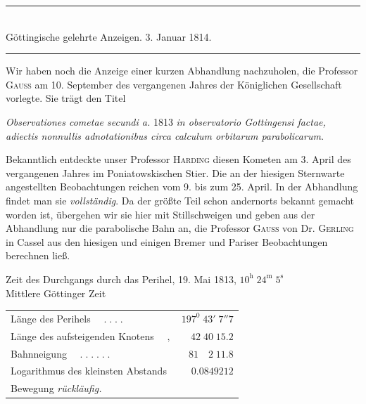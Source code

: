 \clearpage
{}
\begin{center}\rule{.75\textwidth}{.3pt}\\
Göttingische gelehrte Anzeigen. 3. Januar 1814.\\
\rule{.75\textwidth}{.3pt}\end{center}
Wir haben noch die Anzeige einer kurzen Abhandlung nachzuholen, die Professor \textsc{Gauß} am 10. September des vergangenen Jahres der Königlichen Gesellschaft vorlegte. Sie trägt den Titel
\begin{center}
\textit{Observationes cometae secundi a.} 1813 \textit{in observatorio Gottingensi factae, adiectis
nonnullis adnotationibus circa calculum orbitarum parabolicarum.}
\end{center}
Bekanntlich entdeckte unser Professor \textsc{Harding} diesen Kometen am 3. April des vergangenen Jahres im Poniatowskischen Stier. Die an der hiesigen Sternwarte angestellten Beobachtungen reichen vom 9. bis zum 25. April. In der Abhandlung findet man sie \textit{vollständig}. Da der größte Teil schon andernorts bekannt gemacht worden ist, übergehen wir sie hier mit Stillschweigen und geben aus der Abhandlung nur die parabolische Bahn an, die Professor \textsc{Gauß} von Dr. \textsc{Gerling} in Cassel aus den hiesigen und einigen Bremer und Pariser Beobachtungen berechnen ließ.
\begin{center}\small
Zeit des Durchgangs durch das Perihel, 19. Mai 1813, $10^{\mathrm h}\;24^{\mathrm m}\;5^{\mathrm s}$\\
Mittlere Göttinger Zeit
\end{center}
\begin{center}\small
\begin{tabular}{@{}l@{\qquad}r@{}}
Länge des Perihels $\quad.\;.\;.\;.$ & $197^0\;43'\;7''7$\\
Länge des aufsteigenden Knotens $\quad,$ & $42\;40\;15.2$\\
Bahnneigung $\quad.\;.\;.\;.\;.\;.$ & $81\quad2\;11.8$\\
Logarithmus des kleinsten Abstands & $0.0849212$\\
\multicolumn{2}{l}{Bewegung \textit{rückläufig.}}
\end{tabular}\end{center}

